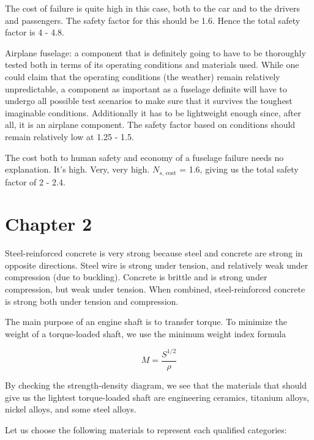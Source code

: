 \documentclass[
10pt,
a4paper,
openany,
svgnames,
]{book}
\begin{document}
\begin{exercises}
  The cost of failure is quite high in this case, both to the car and to the drivers and passengers. The safety factor for this should be 1.6. Hence the total safety factor is 4 - 4.8.

\item Airplane fuselage: a component that is definitely going to have to be thoroughly tested both in terms of its operating conditions and materials used. While one could claim that the operating conditions (the weather) remain relatively unpredictable, a component as important as a fuselage definite will have to undergo all possible test scenarios to make sure that it survives the toughest imaginable conditions. Additionally it has to be lightweight enough since, after all, it is an airplane component. The safety factor based on conditions should remain relatively low at 1.25 - 1.5.

  The cost both to human safety and economy of a fuselage failure needs no explanation. It's high. Very, very high. $N_{s\text{, cost}}$ = 1.6, giving us the total safety factor of 2 - 2.4.
  
\end{exercises}

\section{Chapter 2}

\begin{exercises}
\item Steel-reinforced concrete is very strong because steel and concrete are strong in opposite directions. Steel wire is strong under tension, and relatively weak under compression (due to buckling). Concrete is brittle and is strong under compression, but weak under tension. When combined, steel-reinforced concrete is strong both under tension and compression.

\item The main purpose of an engine shaft is to transfer torque. To minimize the weight of a torque-loaded shaft, we use the minimum weight index formula

  \begin{equation*}
    M = \frac{S^{1/2}}{\rho}
  \end{equation*}

  By checking the strength-density diagram, we see that the materials that should give us the lightest torque-loaded shaft are engineering ceramics, titanium alloys, nickel alloys, and some steel alloys.

  Let us choose the following materials to represent each qualified categories:
\end{exercises}
\end{document}
